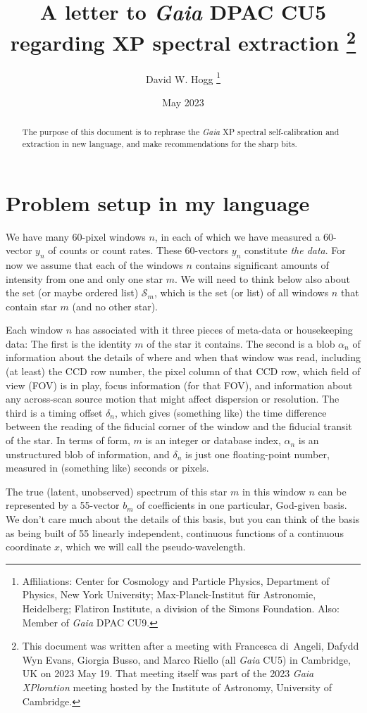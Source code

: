 \documentclass[11pt]{article}
\title{\bfseries
A letter to \textsl{Gaia} DPAC CU5 regarding XP spectral extraction%
\footnote{This document was written after a meeting with Francesca di~Angeli, Dafydd Wyn Evans, Giorgia Busso, and Marco Riello (all \textsl{Gaia} CU5) in Cambridge, UK on 2023 May 19. That meeting itself was part of the 2023 \textsl{Gaia XPloration} meeting hosted by the Institute of Astronomy, University of Cambridge.}}
\author{David W. Hogg%
\footnote{Affiliations: Center for Cosmology and Particle Physics, Department of Physics, New York University; Max-Planck-Institut f\"ur Astronomie, Heidelberg; Flatiron Institute, a division of the Simons Foundation. Also: Member of \textsl{Gaia} DPAC CU9.}}
\date{May 2023}
\begin{document}
\maketitle\thispagestyle{empty}

\begin{abstract}\noindent
    The purpose of this document is to rephrase the \textsl{Gaia} XP spectral self-calibration and extraction in new language, and make recommendations for the sharp bits.
\end{abstract}

\section{Problem setup in my language}

We have many 60-pixel windows $n$, in each of which we have measured a 60-vector $y_n$ of counts or count rates.
These 60-vectors $y_n$ constitute \emph{the data}.
For now we assume that each of the windows $n$ contains significant amounts of intensity from one and only one star $m$.
We will need to think below also about the set (or maybe ordered list) $\mathscr{S}_m$, which is the set (or list) of all windows $n$ that contain star $m$ (and no other star).

Each window $n$ has associated with it three pieces of meta-data or housekeeping data:
The first is the identity $m$ of the star it contains.
The second is a blob $\alpha_n$ of information about the details of where and when that window was read, including (at least) the CCD row number, the pixel column of that CCD row, which field of view (FOV) is in play, focus information (for that FOV), and information about any across-scan source motion that might affect dispersion or resolution.
The third is a timing offset $\delta_n$, which gives (something like) the time difference between the reading of the fiducial corner of the window and the fiducial transit of the star.
In terms of form, $m$ is an integer or database index, $\alpha_n$ is an unstructured blob of information, and $\delta_n$ is just one floating-point number, measured in (something like) seconds or pixels.

The true (latent, unobserved) spectrum of this star $m$ in this window $n$ can be represented by a 55-vector $b_m$ of coefficients in one particular, God-given basis.
We don't care much about the details of this basis, but you can think of the basis as being built of 55 linearly independent, continuous functions of a continuous coordinate $x$, which we will call the pseudo-wavelength.
\end{document}
